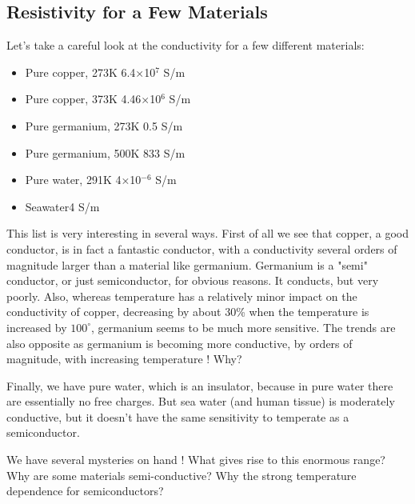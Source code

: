 \subsection{Resistivity for a Few Materials}
Let's take a careful look at the conductivity for a few different materials:
\vspace{.5cm}
\begin{minipage}[c]{.65\textwidth}
\begin{itemize}
\item  Pure copper, 273K \hfill 6.4×10$^{7}$ S/m
\item Pure copper, 373K \hfill 4.46×10$^{6}$ S/m
\item Pure germanium, 273K \hfill 0.5  S/m
\item Pure germanium, 500K \hfill 833 S/m
\item Pure water, 291K \hfill 4×10$^{-6}$ S/m
\item Seawater\hfill 4 S/m
\end{itemize} 
\end{minipage}
\vspace{.5cm}
This list is very interesting in several ways.  First of all we see that copper, a good conductor, is in fact a fantastic conductor, with a conductivity several orders of magnitude larger than a material like germanium.  Germanium is a "semi" conductor, or just semiconductor, for obvious reasons.  It conducts, but very poorly.  Also, whereas temperature has a relatively minor impact on the conductivity of copper, decreasing by about 30\% when the temperature is increased by $100^\circ$, germanium seems to be much more sensitive.  The trends are also opposite as germanium is becoming more conductive, by orders of magnitude, with increasing temperature !  Why?

Finally, we have pure water, which is an insulator, because in pure water there are essentially no free charges.  But sea water (and human tissue) is moderately conductive, but it doesn't have the same sensitivity to temperate as a semiconductor.

We have several mysteries on hand !
What gives rise to this enormous range?
Why are some materials semi-conductive?
Why the strong temperature dependence for semiconductors?
